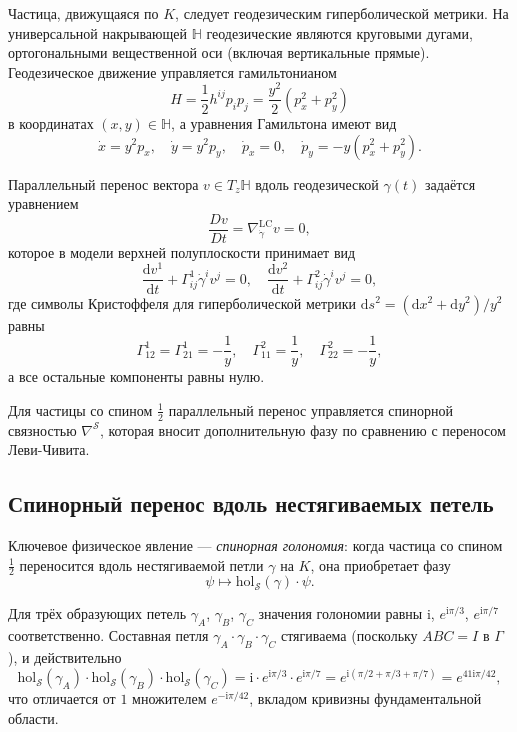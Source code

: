 \documentclass[12pt,a4paper]{article}
\theoremstyle{definition}
\theoremstyle{remark}
\newcommand{\HH}{\mathbb{H}}
\newcommand{\hol}{\mathrm{hol}}
\newcommand{\LC}{\mathrm{LC}}
\newcommand{\cS}{\mathcal{S}}
\newcommand{\dd}{\mathrm{d}}
\newcommand{\ii}{\mathrm{i}}
\begin{document}
Частица, движущаяся по $K$, следует геодезическим гиперболической метрики. На универсальной накрывающей $\HH$ геодезические являются круговыми дугами, ортогональными вещественной оси (включая вертикальные прямые). Геодезическое движение управляется гамильтонианом
\begin{equation}
H = \frac{1}{2} h^{ij} p_i p_j = \frac{y^2}{2}(p_x^2 + p_y^2)
\end{equation}
в координатах $(x, y) \in \HH$, а уравнения Гамильтона имеют вид
\begin{equation}
\dot{x} = y^2 p_x, \quad \dot{y} = y^2 p_y, \quad \dot{p}_x = 0, \quad \dot{p}_y = -y(p_x^2 + p_y^2).
\end{equation}

Параллельный перенос вектора $v \in T_z\HH$ вдоль геодезической $\gamma(t)$ задаётся уравнением
\begin{equation}
\frac{Dv}{Dt} = \nabla^{\LC}_{\dot{\gamma}} v = 0,
\end{equation}
которое в модели верхней полуплоскости принимает вид
\begin{equation}
\frac{\dd v^1}{\dd t} + \Gamma^1_{ij} \dot{\gamma}^i v^j = 0, \quad \frac{\dd v^2}{\dd t} + \Gamma^2_{ij} \dot{\gamma}^i v^j = 0,
\end{equation}
где символы Кристоффеля для гиперболической метрики $\dd s^2 = (\dd x^2 + \dd y^2)/y^2$ равны
\begin{equation}
\Gamma^1_{12} = \Gamma^1_{21} = -\frac{1}{y}, \quad \Gamma^2_{11} = \frac{1}{y}, \quad \Gamma^2_{22} = -\frac{1}{y},
\end{equation}
а все остальные компоненты равны нулю.

Для частицы со спином $\frac{1}{2}$ параллельный перенос управляется спинорной связностью $\nabla^{\cS}$, которая вносит дополнительную фазу по сравнению с переносом Леви-Чивита.

\subsection{Спинорный перенос вдоль нестягиваемых петель}

Ключевое физическое явление --- \emph{спинорная голономия}: когда частица со спином $\frac{1}{2}$ переносится вдоль нестягиваемой петли $\gamma$ на $K$, она приобретает фазу
\begin{equation}
\psi \mapsto \hol_{\cS}(\gamma) \cdot \psi.
\end{equation}

Для трёх образующих петель $\gamma_A$, $\gamma_B$, $\gamma_C$ значения голономии равны $\ii$, $e^{\ii\pi/3}$, $e^{\ii\pi/7}$ соответственно. Составная петля $\gamma_A \cdot \gamma_B \cdot \gamma_C$ стягиваема (поскольку $ABC = I$ в $\Gamma$), и действительно
\begin{equation}
\hol_{\cS}(\gamma_A) \cdot \hol_{\cS}(\gamma_B) \cdot \hol_{\cS}(\gamma_C) = \ii \cdot e^{\ii\pi/3} \cdot e^{\ii\pi/7} = e^{\ii(\pi/2 + \pi/3 + \pi/7)} = e^{41\ii\pi/42},
\end{equation}
что отличается от $1$ множителем $e^{-\ii\pi/42}$, вкладом кривизны фундаментальной области.
\end{document}
